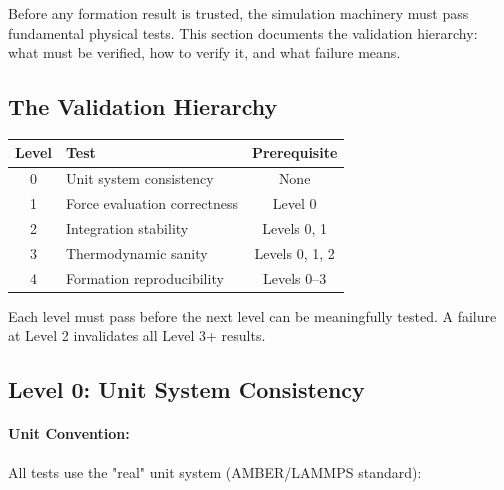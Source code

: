 \documentclass[11pt]{article}
\begin{document}
Before any formation result is trusted, the simulation machinery must pass fundamental physical tests. This section documents the validation hierarchy: what must be verified, how to verify it, and what failure means.

\subsection{The Validation Hierarchy}

\begin{center}
\begin{tabular}{clc}
\toprule
Level & Test & Prerequisite \\
\midrule
0 & Unit system consistency & None \\
1 & Force evaluation correctness & Level 0 \\
2 & Integration stability & Levels 0, 1 \\
3 & Thermodynamic sanity & Levels 0, 1, 2 \\
4 & Formation reproducibility & Levels 0--3 \\
\bottomrule
\end{tabular}
\end{center}

Each level must pass before the next level can be meaningfully tested. A failure at Level 2 invalidates all Level 3+ results.

\subsection{Level 0: Unit System Consistency}

\paragraph{Unit Convention:}

All tests use the "real" unit system (AMBER/LAMMPS standard):

\begin{center}
\end{center}
\end{document}
